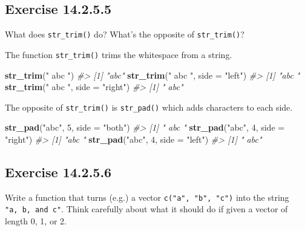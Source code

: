 \documentclass[]{book}
\newenvironment{Shaded}{\begin{snugshade}}{\end{snugshade}}
\newcommand{\CommentTok}[1]{\textcolor[rgb]{0.56,0.35,0.01}{\textit{#1}}}
\newcommand{\DataTypeTok}[1]{\textcolor[rgb]{0.13,0.29,0.53}{#1}}
\newcommand{\DecValTok}[1]{\textcolor[rgb]{0.00,0.00,0.81}{#1}}
\newcommand{\KeywordTok}[1]{\textcolor[rgb]{0.13,0.29,0.53}{\textbf{#1}}}
\newcommand{\NormalTok}[1]{#1}
\newcommand{\StringTok}[1]{\textcolor[rgb]{0.31,0.60,0.02}{#1}}
\theoremstyle{plain}
\theoremstyle{remark}
\begin{document}
\hypertarget{exercise-14.2.5.5}{%
\subsection*{\texorpdfstring{Exercise
{14.2.5.5}}{Exercise 14.2.5.5}}\label{exercise-14.2.5.5}}

What does \texttt{str\_trim()} do? What's the opposite of
\texttt{str\_trim()}?

The function \texttt{str\_trim()} trims the whitespace from a string.

\begin{Shaded}
\begin{Highlighting}[]
\KeywordTok{str_trim}\NormalTok{(}\StringTok{" abc "}\NormalTok{)}
\CommentTok{#> [1] "abc"}
\KeywordTok{str_trim}\NormalTok{(}\StringTok{" abc "}\NormalTok{, }\DataTypeTok{side =} \StringTok{"left"}\NormalTok{)}
\CommentTok{#> [1] "abc "}
\KeywordTok{str_trim}\NormalTok{(}\StringTok{" abc "}\NormalTok{, }\DataTypeTok{side =} \StringTok{"right"}\NormalTok{)}
\CommentTok{#> [1] " abc"}
\end{Highlighting}
\end{Shaded}

The opposite of \texttt{str\_trim()} is \texttt{str\_pad()} which adds
characters to each side.

\begin{Shaded}
\begin{Highlighting}[]
\KeywordTok{str_pad}\NormalTok{(}\StringTok{"abc"}\NormalTok{, }\DecValTok{5}\NormalTok{, }\DataTypeTok{side =} \StringTok{"both"}\NormalTok{)}
\CommentTok{#> [1] " abc "}
\KeywordTok{str_pad}\NormalTok{(}\StringTok{"abc"}\NormalTok{, }\DecValTok{4}\NormalTok{, }\DataTypeTok{side =} \StringTok{"right"}\NormalTok{)}
\CommentTok{#> [1] "abc "}
\KeywordTok{str_pad}\NormalTok{(}\StringTok{"abc"}\NormalTok{, }\DecValTok{4}\NormalTok{, }\DataTypeTok{side =} \StringTok{"left"}\NormalTok{)}
\CommentTok{#> [1] " abc"}
\end{Highlighting}
\end{Shaded}

\hypertarget{exercise-14.2.5.6}{%
\subsection*{\texorpdfstring{Exercise
{14.2.5.6}}{Exercise 14.2.5.6}}\label{exercise-14.2.5.6}}

Write a function that turns (e.g.) a vector \texttt{c("a",\ "b",\ "c")}
into the string \texttt{"a,\ b,\ and\ c"}. Think carefully about what it
should do if given a vector of length 0, 1, or 2.
\end{document}
